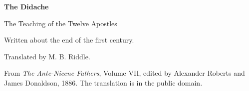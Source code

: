 \documentclass[11pt,letterpaper]{article}
\begin{document}
\color{ink}

\begin{titlepage}
\centering
\vspace*{4em}
{\LARGE\bfseries\color{heading} The Didache\par}
\vspace{1em}
{\large The Teaching of the Twelve Apostles\par}
\vspace{3em}
{Written about the end of the first century.\par}
\vspace{0.6em}
{Translated by M. B. Riddle.\par}
\vfill
{\small From \emph{The Ante-Nicene Fathers}, Volume VII, edited by Alexander
Roberts and James Donaldson, 1886. The translation is in the public
domain.\par}
\vspace{2em}
\end{titlepage}

\tableofcontents
\clearpage


\end{document}
